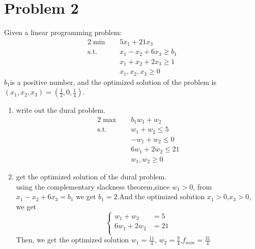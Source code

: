 \documentclass[paper=a4, fontsize=11pt]{scrartcl} %
\numberwithin{equation}{section} %
\numberwithin{figure}{section} %
\numberwithin{table}{section} %
\begin{document}
\section{Problem 2}
Given a linear programming problem:
\begin{alignat}{2}          \nonumber
\min\quad & 5x_1+21x_3 \\    \nonumber
\mbox{s.t.}\quad            \nonumber
& x_1-x_2+6x_3 \geq b_1\\        \nonumber
& x_1+x_2+2x_3 \geq 1\\         \nonumber
& x_1,x_2,x_3 \geq 0
\end{alignat}
$b_1$is a positive number, and the optimized solution of the problem is $(x_1, x_2, x_3)=(\frac{1}{2}, 0, \frac{1}{4})$.
\begin{enumerate}
\item write out the dural problem.\\
\begin{alignat}{2}          \nonumber
\max\quad & b_1w_1+w_2 \\    \nonumber
\mbox{s.t.}\quad & w_1+w_2 \leq 5\\        \nonumber
& -w_1+w_2\leq 0\\         \nonumber
& 6w_1+2w_2\leq 21\\         \nonumber
& w_1,w_2 \geq 0
\end{alignat}
\item get the optimized solution of the dural problem.\\
using the complementary slackness theorem,since $w_1>0$, from $x_1-x_2+6x_3=b_1$ we get $b_1=2$.And the optimized solution $x_1>0$,$x_3>0$, we get
\begin{equation}
\left\{
\begin{aligned} \nonumber
w_1+w_2 &= 5 \\
6w_1+2w_2 &=21 \\
\end{aligned}
\right.
\end{equation}
Then, we get the optimized solution $w_1=\frac{11}{4}$, $w_2=\frac{9}{4}$,$f_{min}=\frac{31}{4}$
\end{enumerate}
\end{document}
